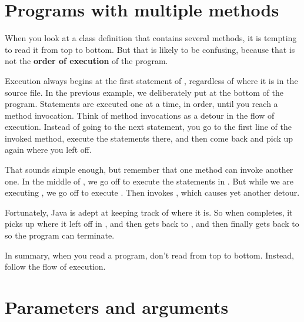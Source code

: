 \section{Programs with multiple methods}


When you look at a class definition that contains several methods, it is tempting to read it from top to bottom.
But that is likely to be confusing, because that is not the {\bf order of execution} of the program.

Execution always begins at the first statement of , regardless of where it is in the source file.
In the previous example, we deliberately put  at the bottom of the program.
Statements are executed one at a time, in order, until you reach a method invocation.
Think of method invocations as a detour in the flow of execution.
Instead of going to the next statement, you go to the first line of the invoked method, execute the statements there, and then come back and pick up again where you left off.

That sounds simple enough, but remember that one method can invoke another one.
In the middle of , we go off to execute the statements in .
But while we are executing , we go off to execute .
Then  invokes , which causes yet another detour.

Fortunately, Java is adept at keeping track of where it is.
So when  completes, it picks up where it left off in , and then gets back to , and then finally gets back to  so the program can terminate.


In summary, when you read a program, don't read from top to bottom.
Instead, follow the flow of execution.


\section{Parameters and arguments}


